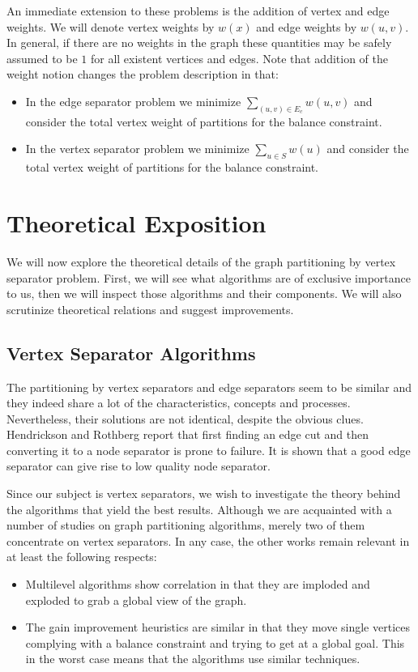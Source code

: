 \documentclass[a4paper,12pt]{article}
\begin{document}
An immediate extension to these problems is the addition of vertex
and edge weights. We will denote vertex weights by $w(x)$ and edge
weights by $w(u,v)$. In general, if there are no weights in the
graph these quantities may be safely assumed to be $1$ for all
existent vertices and edges. Note that addition of the weight notion
changes the problem description in that:
\begin{itemize}
\item In the edge separator problem we minimize $\sum_{(u,v) \in
E_c}{w(u,v)}$ and consider the total vertex weight of partitions for the balance
constraint.
\item In the vertex separator problem we minimize $\sum_{u \in
S}{w(u)}$ and consider the total vertex weight of partitions for the
balance constraint.
\end{itemize}

\section{Theoretical Exposition}

We will now explore the theoretical details of the graph
partitioning by vertex separator problem. First, we will see
what algorithms are of exclusive importance to us, then we
will inspect those algorithms and their components. We will
also scrutinize theoretical relations and suggest improvements.

\subsection{Vertex Separator Algorithms}

The partitioning by vertex separators and edge separators
seem to be similar and they indeed share a lot of the
characteristics, concepts and processes. Nevertheless,
 their solutions are not identical, despite the obvious
clues. Hendrickson and Rothberg report that first finding
an edge cut and then converting it to a node separator is
prone to failure.\cite{bend} It is shown that a good edge
separator can give rise to low quality node separator.

Since our subject is vertex separators, we wish to
investigate the theory behind the algorithms that yield the best
results. Although we are acquainted with a number of studies on
graph partitioning algorithms, merely two of them concentrate
on vertex separators. 
\cite{liu} \cite{bend} In any case, the other works remain relevant in
at least the following respects:
\begin{itemize}
\item Multilevel algorithms show correlation in that they are imploded
and exploded to grab a global view of the graph.
\item The gain improvement heuristics are similar in that they move
single vertices complying with a balance constraint and trying to
get at a global goal. This in the worst case means that the algorithms use
similar techniques.
\end{itemize}
\end{document}
